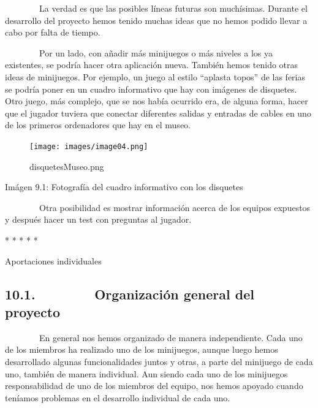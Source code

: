 
~~~~~~~~La verdad es que las posibles líneas futuras son muchísimas.
Durante el desarrollo del proyecto hemos tenido muchas ideas que no
hemos podido llevar a cabo por falta de tiempo.

~~~~~~~~Por un lado, con añadir más minijuegos o más niveles a los ya
existentes, se podría hacer otra aplicación nueva. También hemos tenido
otras ideas de minijuegos. Por ejemplo, un juego al estilo ``aplasta
topos'' de las ferias se podría poner en un cuadro informativo que hay
con imágenes de disquetes. Otro juego, más complejo, que se nos había
ocurrido era, de alguna forma, hacer que el jugador tuviera que conectar
diferentes salidas y entradas de cables en uno de los primeros
ordenadores que hay en el museo.

\begin{figure}[htbp]
\centering
\texttt{[image: images/image04.png]}
\caption{disquetesMuseo.png}
\end{figure}

Imágen 9.1: Fotografía del cuadro informativo con los disquetes

~~~~~~~~Otra posibilidad es mostrar información acerca de los equipos
expuestos y después hacer un test con preguntas al jugador.

* * * * *


Aportaciones individuales

\subsection{10.1.~~~~~~~~Organización general del
proyecto}\label{organizaciuxf3n-general-del-proyecto}

~~~~~~~~En general nos hemos organizado de manera independiente. Cada
uno de los miembros ha realizado uno de los minijuegos, aunque luego
hemos desarrollado algunas funcionalidades juntos y otras, a parte del
minijuego de cada uno, también de manera individual. Aun siendo cada uno
de los minijuegos responsabilidad de uno de los miembros del equipo, nos
hemos apoyado cuando teníamos problemas en el desarrollo individual de
cada uno.

